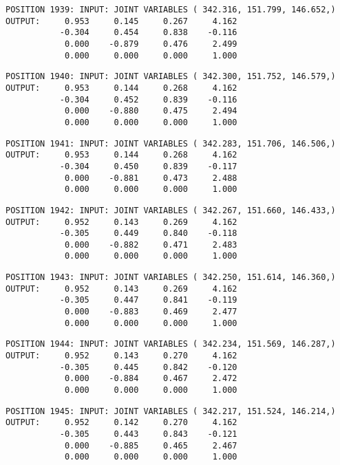 \begin{verbatim}
POSITION 1939: INPUT: JOINT VARIABLES ( 342.316, 151.799, 146.652,)
OUTPUT:     0.953     0.145     0.267     4.162
           -0.304     0.454     0.838    -0.116
            0.000    -0.879     0.476     2.499
            0.000     0.000     0.000     1.000
\end{verbatim} \pagebreak[1]\begin{verbatim}
POSITION 1940: INPUT: JOINT VARIABLES ( 342.300, 151.752, 146.579,)
OUTPUT:     0.953     0.144     0.268     4.162
           -0.304     0.452     0.839    -0.116
            0.000    -0.880     0.475     2.494
            0.000     0.000     0.000     1.000
\end{verbatim} \pagebreak[1]\begin{verbatim}
POSITION 1941: INPUT: JOINT VARIABLES ( 342.283, 151.706, 146.506,)
OUTPUT:     0.953     0.144     0.268     4.162
           -0.304     0.450     0.839    -0.117
            0.000    -0.881     0.473     2.488
            0.000     0.000     0.000     1.000
\end{verbatim} \pagebreak[1]\begin{verbatim}
POSITION 1942: INPUT: JOINT VARIABLES ( 342.267, 151.660, 146.433,)
OUTPUT:     0.952     0.143     0.269     4.162
           -0.305     0.449     0.840    -0.118
            0.000    -0.882     0.471     2.483
            0.000     0.000     0.000     1.000
\end{verbatim} \pagebreak[1]\begin{verbatim}
POSITION 1943: INPUT: JOINT VARIABLES ( 342.250, 151.614, 146.360,)
OUTPUT:     0.952     0.143     0.269     4.162
           -0.305     0.447     0.841    -0.119
            0.000    -0.883     0.469     2.477
            0.000     0.000     0.000     1.000
\end{verbatim} \pagebreak[1]\begin{verbatim}
POSITION 1944: INPUT: JOINT VARIABLES ( 342.234, 151.569, 146.287,)
OUTPUT:     0.952     0.143     0.270     4.162
           -0.305     0.445     0.842    -0.120
            0.000    -0.884     0.467     2.472
            0.000     0.000     0.000     1.000
\end{verbatim} \pagebreak[1]\begin{verbatim}
POSITION 1945: INPUT: JOINT VARIABLES ( 342.217, 151.524, 146.214,)
OUTPUT:     0.952     0.142     0.270     4.162
           -0.305     0.443     0.843    -0.121
            0.000    -0.885     0.465     2.467
            0.000     0.000     0.000     1.000
\end{verbatim} \pagebreak[1]\begin{verbatim}

\end{verbatim}

